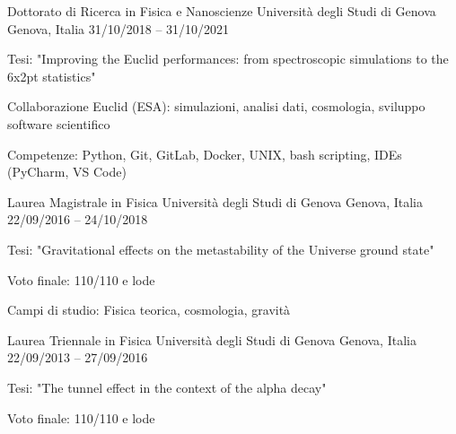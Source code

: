 


\begin{cventries}


\cventry
{Dottorato di Ricerca in Fisica e Nanoscienze} %
{Università degli Studi di Genova} %
{Genova, Italia} %
{31/10/2018 -- 31/10/2021} %
{ %
\begin{cvitems}
\item {Tesi: "Improving the Euclid performances: from spectroscopic simulations to the 6x2pt statistics"}
\item {Collaborazione Euclid (ESA): simulazioni, analisi dati, cosmologia, sviluppo software scientifico}
\item {Competenze: Python, Git, GitLab, Docker, UNIX, bash scripting, IDEs (PyCharm, VS Code)}
\end{cvitems}
}

\vspace{10em}


\cventry
{Laurea Magistrale in Fisica} %
{Università degli Studi di Genova} %
{Genova, Italia} %
{22/09/2016 -- 24/10/2018} %
{ %
\begin{cvitems}
\item {Tesi: "Gravitational effects on the metastability of the Universe ground state"}
\item {Voto finale: 110/110 e lode}
\item {Campi di studio: Fisica teorica, cosmologia, gravità}
\end{cvitems}
}


\cventry
{Laurea Triennale in Fisica} %
{Università degli Studi di Genova} %
{Genova, Italia} %
{22/09/2013 -- 27/09/2016} %
{ %
\begin{cvitems}
\item {Tesi: "The tunnel effect in the context of the alpha decay"}
\item {Voto finale: 110/110 e lode}
\end{cvitems}
}


\end{cventries}